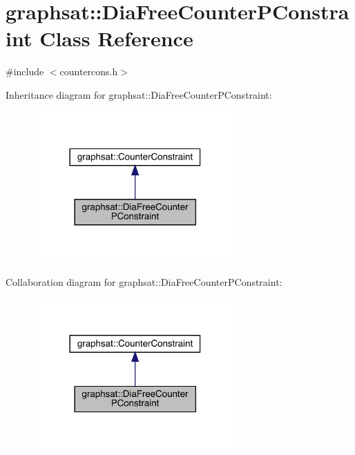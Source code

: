 \hypertarget{classgraphsat_1_1_dia_free_counter_p_constraint}{}\section{graphsat\+::Dia\+Free\+Counter\+P\+Constraint Class Reference}
\label{classgraphsat_1_1_dia_free_counter_p_constraint}


{\ttfamily \#include $<$countercons.\+h$>$}



Inheritance diagram for graphsat\+::Dia\+Free\+Counter\+P\+Constraint\+:\nopagebreak
\begin{figure}[H]
\begin{center}
\leavevmode
\includegraphics[width=222pt]{classgraphsat_1_1_dia_free_counter_p_constraint__inherit__graph}
\end{center}
\end{figure}


Collaboration diagram for graphsat\+::Dia\+Free\+Counter\+P\+Constraint\+:\nopagebreak
\begin{figure}[H]
\begin{center}
\leavevmode
\includegraphics[width=222pt]{classgraphsat_1_1_dia_free_counter_p_constraint__coll__graph}
\end{center}
\end{figure}
